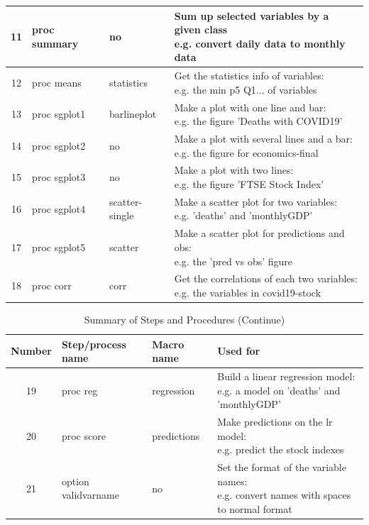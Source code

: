 \documentclass[12pt, a4paper]{report}
\begin{document}
\begin{appendices}
\begin{table}[H]
\begin{tabular}{|c|l|l|l|}
        \hline 
        11&proc summary&no&\makecell[l]{Sum up selected variables by a given class\\e.g. convert daily data to monthly data}\\
        \hline       
        12&proc means&statistics&\makecell[l]{Get the statistics info of variables:\\e.g. the min p5 Q1... of variables}\\
        \hline
        13&proc sgplot1&barlineplot&\makecell[l]{Make a plot with one line and bar:\\e.g. the figure 'Deaths with COVID19'}\\
        \hline
        14&proc sgplot2&no&\makecell[l]{Make a plot with several lines and a bar:\\e.g. the figure for economics-final}\\
        \hline
        15&proc sgplot3&no&\makecell[l]{Make a plot with two lines:\\e.g. the figure 'FTSE Stock Index'}\\
        \hline
        16&proc sgplot4&scatter-single&\makecell[l]{Make a scatter plot for two variables:\\e.g. 'deaths' and 'monthlyGDP'}\\
        \hline
        17&proc sgplot5&scatter&\makecell[l]{Make a scatter plot for predictions and obs:\\e.g. the 'pred vs obs' figure}\\
        \hline
        18&proc corr&corr&\makecell[l]{Get the correlations of each two variables:\\e.g. the variables in covid19-stock}\\
        \hline

    \end{tabular}
\end{table}   

\setcounter{table}{0}
\begin{table}[H]
    \caption{Summary of Steps and Procedures (Continue)}
    \begin{tabular}{|c|l|l|l|}
        \hline
        Number&Step/process name&Macro name&Used for\\
        \hline
        19&proc reg&regression&\makecell[l]{Build a linear regression model:\\e.g. a model on 'deaths' and 'monthlyGDP'}\\
        \hline
        20&proc score&predictions&\makecell[l]{Make predictions on the lr model:\\e.g. predict the stock indexes}\\
        \hline              
        21&option validvarname&no&\makecell[l]{Set the format of the variable names:\\e.g. convert names with spaces
        to normal format}\\
        \hline

    \end{tabular}
\end{table} 

\end{appendices}
\end{document}
